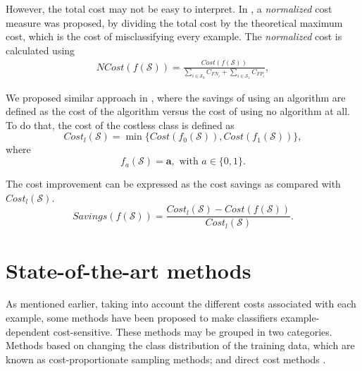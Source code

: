 However, the total cost may not be easy to interpret. In \citep{Whitrow2008}, a 
	\textit{normalized} cost measure was proposed, by dividing the total cost by the theoretical 
	maximum cost, which is the cost of misclassifying every example. The \textit{normalized} cost is 
	calculated using
  \begin{align}\label{eq:ncost}
    NCost(f(\mathcal{S})) = \frac{Cost(f(\mathcal{S}))}
    {\sum_{i \in \mathcal{S}_0} C_{FN_i} + 
    \sum_{i \in \mathcal{S}_1} C_{FP_i}},
  \end{align} 
  
	We proposed similar approach in \citep{CorreaBahnsen2014b}, where the savings of using an 
	algorithm  are defined as the cost of the algorithm versus the cost of using no algorithm at all. 
	To do that, the cost of the costless class is defined as 
	\begin{equation}
		Cost_l(\mathcal{S}) = \min \{Cost(f_0(\mathcal{S})), Cost(f_1(\mathcal{S}))\},
	\end{equation}
	where 
	\begin{equation}\label{eq:f_a}
		f_a(\mathcal{S}) = \mathbf{a}, \text{ with } a\in \{0,1\}.
	\end{equation}

	The cost improvement can be expressed as the cost savings as compared with $Cost_l(\mathcal{S})$. 
  \begin{equation}\label{eq:savings}
    Savings(f(\mathcal{S})) = \frac{ Cost_l(\mathcal{S}) - Cost(f(\mathcal{S}))}
		{Cost_l(\mathcal{S})}.
  \end{equation} 


\section{State-of-the-art methods}
	  As mentioned earlier, taking into account the different costs associated with each example, 
	  some methods have been proposed to make classifiers example-dependent cost-sensitive. These 
		methods may be grouped in two categories. Methods based on changing the class distribution of 
		the training data, which are known as cost-proportionate sampling methods; and direct cost 
		methods \citep{Wang2013}.
  
